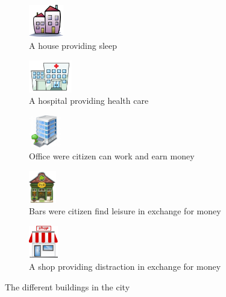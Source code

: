 \documentclass[table]{sig-alternate-05-2015}
\begin{document}
\begin{figure}[h]
\begin{subfigure}{0.22\textwidth}
\begin{center}
\includegraphics[height = 40pt]{Pictures/Home.png}
\caption{A house providing sleep}
\end{center}
\end{subfigure}
\begin{subfigure}{0.22\textwidth}
\begin{center}
\includegraphics[height = 40pt]{Pictures/Hospital.png}
\caption{A hospital providing health care}
\end{center}
\end{subfigure}
\begin{subfigure}{0.22\textwidth}
\begin{center}
\includegraphics[height =40pt]{Pictures/Office.png}
\caption{Office were citizen can work and earn money}
\end{center}
\end{subfigure}
\begin{subfigure}{0.22\textwidth}
\begin{center}
\includegraphics[height =40pt]{Pictures/Bar.png}
\caption{Bars were citizen find leisure in exchange for money}
\end{center}
\end{subfigure}
\begin{subfigure}{0.22\textwidth}
\begin{center}
\includegraphics[height =40pt]{Pictures/Shop.png}
\caption{A shop providing distraction in exchange for money}
\end{center}
\end{subfigure}
\caption{The different buildings in the city}
\label{fig:buildings}
\end{figure}
\end{document}

